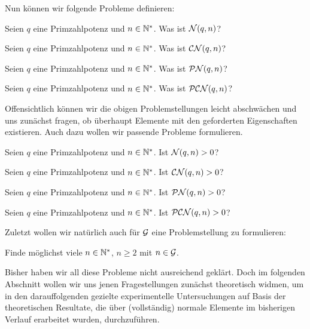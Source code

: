 Nun können wir folgende Probleme definieren:

\begin{problem}[$\cal N(q,n)=?$]
  \label{prob:n=}
  Seien $q$ eine Primzahlpotenz und $n\in \N^\ast$. Was ist
  $\cal N(q,n)$?
\end{problem}
\begin{problem}[$\CN(q,n)=?$]
  \label{prob:cn=}
  Seien $q$ eine Primzahlpotenz und $n\in \N^\ast$. Was ist
  $\CN(q,n)$?
\end{problem}
\begin{problem}[$\PN(q,n)=?$]
  \label{prob:pn=}
  Seien $q$ eine Primzahlpotenz und $n\in \N^\ast$. Was ist
  $\PN(q,n)$?
\end{problem}
\begin{problem}[$\PCN(q,n)=?$]
  \label{prob:pcn=}
  Seien $q$ eine Primzahlpotenz und $n\in \N^\ast$. Was ist
  $\PCN(q,n)$?
\end{problem}

Offensichtlich können wir die obigen Problemstellungen leicht abschwächen und
uns zunächst fragen, ob überhaupt Elemente mit den geforderten Eigenschaften
existieren. Auch dazu wollen wir passende Probleme formulieren.

\begin{problem}[$\cal N(q,n)>0?$]
  \label{prob:n>0}
  Seien $q$ eine Primzahlpotenz und $n\in \N^\ast$. Ist
  $\cal N(q,n)>0$?
\end{problem}
\begin{problem}[$\CN(q,n)>0?$]
  \label{prob:cn>0}
  Seien $q$ eine Primzahlpotenz und $n\in \N^\ast$. Ist
  $\CN(q,n)>0$?
\end{problem}
\begin{problem}[$\PN(q,n)>0?$]
  \label{prob:pn>0}
  Seien $q$ eine Primzahlpotenz und $n\in \N^\ast$. Ist
  $\PN(q,n)>0$?
\end{problem}
\begin{problem}[$\PCN(q,n)>0?$]
  \label{prob:pcn>0}
  Seien $q$ eine Primzahlpotenz und $n\in \N^\ast$. Ist
  $\PCN(q,n)>0$?
\end{problem}


Zuletzt wollen wir natürlich auch für $\G$ eine Problemstellung 
zu formulieren:

\begin{problem}[$n\in \G ?$]
  \label{prob:g}
  Finde möglichst viele $n\in \N^\ast$, $n\geq 2$ mit $n\in \G$.
\end{problem}

Bisher haben wir all diese Probleme nicht ausreichend geklärt. Doch im
folgenden Abschnitt wollen wir uns jenen Fragestellungen zunächst theoretisch
widmen, um in den darauffolgenden gezielte experimentelle Untersuchungen 
auf Basis der
theoretischen Resultate, die über (vollständig) normale Elemente im bisherigen
Verlauf erarbeitet wurden, durchzuführen.


